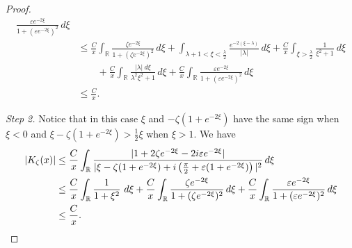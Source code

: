 \documentclass[GreensFunctions.tex]{subfiles}
\begin{document}
\begin{proof}
\begin{align*}
						\frac{\varepsilon e^{-2\xi}}{1 + (\varepsilon e^{-2\xi})^2}
					\,d\xi
					\\
			&\le 
				\frac Cx
				\int_{\mathbb R} 
					\frac{\zeta e^{-2\xi}}{1+(\zeta e^{-2\xi})^2}
				\,d\xi 
				+ 
				\int_{\lambda+1<\xi<\frac\lambda 2}
					\frac{e^{-2(\xi-\lambda)}}{|\lambda|}
				\,d\xi+\frac C x \int_{\xi>\frac\lambda 2}\frac{1}{\xi^2+1}~d\xi 
				\\
			&\qquad+ 
				\frac{C}{x} 
				\int_{\mathbb R} 
					\frac{|\lambda |~d\xi}{\lambda^2\xi^2+1}
				\,d\xi 
				+ \frac Cx 
				\int_{\mathbb R} 
					\frac{\varepsilon e^{-2\xi}}{1 + (\varepsilon e^{-2\xi})^2}
				\,d\xi
				\\
			&\le \frac Cx.
	\end{align*}



	{\em Step 2.} 
	Notice that in this case $\xi$ and $-\zeta(1+e^{-2\xi})$ have the same sign when 
	$\xi<0$ and $\xi-\zeta(1+e^{-2\xi})>\frac12\xi$ when $\xi>1$. We have
	\begin{align*}
		\left|K_\zeta(x)\right|
			&\le 
				\frac Cx 
				\int_{\mathbb R} 
					\frac{|1+2\zeta e^{-2\xi}-2i\varepsilon e^{-2\xi}|}
						{
							|\xi-\zeta(1+e^{-2\xi})
							+i
							\left(
								\frac{\pi}{2}+\varepsilon(1+e^{-2\xi})
							\right)
							|^2
						}
				\,d\xi\\
			&\le  
				\frac Cx 
				\int_{\mathbb R} \frac{1}{1+\xi^2}~d\xi 
				+ \frac Cx 
				\int_{\mathbb R} 
					\frac{\zeta e^{-2\xi}}{1+(\zeta e^{-2\xi})^2}
				\,d\xi 
				+ \frac{C}{x}
				\int_{\mathbb R} 
					\frac{\varepsilon e^{-2\xi}}{1+(\varepsilon e^{-2\xi})^2}
				\,d\xi
				\notag\\
		&\le 
			\frac Cx.
	\end{align*}




\end{proof}
\end{document}
